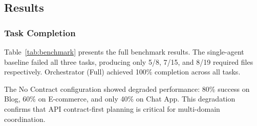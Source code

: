 \documentclass[12pt]{article}
\begin{document}
\subsection{Results}

\subsubsection{Task Completion}

Table~\ref{tab:benchmark} presents the full benchmark results. The single-agent baseline failed all three tasks, producing only 5/8, 7/15, and 8/19 required files respectively. Orchestrator (Full) achieved 100\% completion across all tasks.

The No Contract configuration showed degraded performance: 80\% success on Blog, 60\% on E-commerce, and only 40\% on Chat App. This degradation confirms that API contract-first planning is critical for multi-domain coordination.
\end{document}
